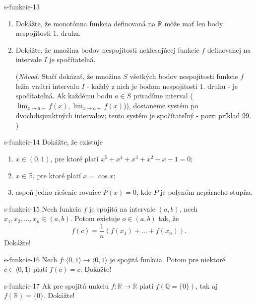   \begin{defproblem}{s-funkcie-13}
  \begin{enumerate}
  \item Dokážte, že monotónna funkcia definovaná na $\mathbb{R}$ môže mať len body nespojitosti $1.$ druhu.
  \item Dokážte, že množina bodov nespojitosti neklesajúcej funkcie $f$ definovanej na intervale $I$ je spočítateľná.

  (\textit{Návod:} Stačí dokázať, že množina $S$ všetkých bodov nespojitosti funkcie $f$ ležia vnútri intervalu $I$ - každý z nich je bodom nespojitosti $1.$ druhu - je spočítateľná. Ak každému bodu $a \in S$ priradíme interval ($\lim_{x \rightarrow a-}f(x),\lim_{x \rightarrow a+}f(x)$)), dostaneme systém po dvochdisjunktných intervalov; tento systém je spočítateľný - pozri príklad $99$. )

  \end{enumerate}
  \end{defproblem}

  \begin{defproblem}{s-funkcie-14}
  Dokážte, že existuje
  \begin{enumerate}
  \item $x \in (0,1)$, pre ktoré platí $x^5+x^4+x^3+x^2-x-1=0$;
  \item $x \in \mathbb{R}$, pre ktoré platí $x=\cos x$;
  \item aspoň jedno riešenie rovnice $P(x)=0$, kde $P$ je polynóm nepárneho stupňa.
  \end{enumerate}
  \end{defproblem}

  \begin{defproblem}{s-funkcie-15}
  Nech funkcia $f$ je spojitá na intervale $(a,b)$, nech $x_1,x_2,...,x_n \in (a,b)$. Potom existuje $o \in (a,b)$ tak, že
  $$f(c)=\frac{1}{n}(f(x_1)+...+f(x_n)).$$ Dokážte!
  \end{defproblem}

  \begin{defproblem}{s-funkcie-16}
  Nech $f:\langle 0,1 \rangle \rightarrow \langle 0,1 \rangle$ je spojitá funkcia. Potom pre niektoré $c \in \langle 0,1 \rangle$ platí $f(c)=c$. Dokážte!
  \end{defproblem}

  \begin{defproblem}{s-funkcie-17}
  Ak pre spojitú unkciu $f: \mathbb{R} \rightarrow \mathbb{R}$ platí $f(\mathbb{Q}= \{0\})$, tak aj $f(\mathbb{R})=\{0\}$. Dokážte!
  \end{defproblem}

